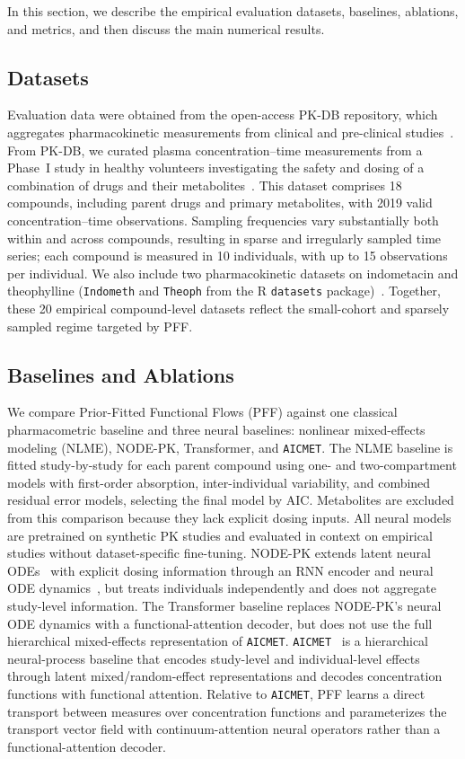 In this section, we describe the empirical evaluation datasets, baselines, ablations, and metrics, and then discuss the main numerical results.

\subsection{Datasets}
\label{sec:data}
Evaluation data were obtained from the open-access PK-DB repository, which aggregates pharmacokinetic measurements from clinical and pre-clinical studies~\citep{grzegorzewski2021pkdb}.
%
From PK-DB, we curated plasma concentration--time measurements from a Phase~I study in healthy volunteers investigating the safety and dosing of a combination of drugs and their metabolites~\citep{lenuzza2016safety}.
%
This dataset comprises 18 compounds, including parent drugs and primary metabolites, with 2019 valid concentration--time observations.
%
Sampling frequencies vary substantially both within and across compounds, resulting in sparse and irregularly sampled time series; each compound is measured in 10 individuals, with up to 15 observations per individual.
%
We also include two pharmacokinetic datasets on indometacin and theophylline (\texttt{Indometh} and \texttt{Theoph} from the R \texttt{datasets} package)~\citep{Rsoftware}.
%
Together, these 20 empirical compound-level datasets reflect the small-cohort and sparsely sampled regime targeted by PFF.

\subsection{Baselines and Ablations}
\label{sec:baselines}

We compare Prior-Fitted Functional Flows (PFF) against one classical pharmacometric baseline and three neural baselines: nonlinear mixed-effects modeling (NLME), NODE-PK, Transformer, and \texttt{AICMET}.
%
The NLME baseline is fitted study-by-study for each parent compound using one- and two-compartment models with first-order absorption, inter-individual variability, and combined residual error models, selecting the final model by AIC. Metabolites are excluded from this comparison because they lack explicit dosing inputs.
%
All neural models are pretrained on synthetic PK studies and evaluated in context on empirical studies without dataset-specific fine-tuning.
%
NODE-PK extends latent neural ODEs~\citep{rubanova2019latent} with explicit dosing information through an RNN encoder and neural ODE dynamics~\citep{lu2021deep}, but treats individuals independently and does not aggregate study-level information.
%
The Transformer baseline replaces NODE-PK's neural ODE dynamics with a functional-attention decoder, but does not use the full hierarchical mixed-effects representation of \texttt{AICMET}.
%
\texttt{AICMET}~\citep{marin2025amortized} is a hierarchical neural-process baseline that encodes study-level and individual-level effects through latent mixed/random-effect representations and decodes concentration functions with functional attention.
%
Relative to \texttt{AICMET}, PFF learns a direct transport between measures over concentration functions and parameterizes the transport vector field with continuum-attention neural operators rather than a functional-attention decoder.


